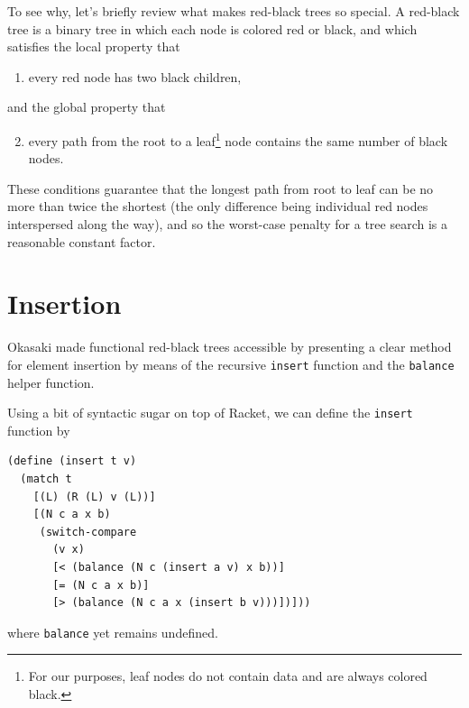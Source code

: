 \documentclass[preprint]{sigplanconf}
\begin{document}
To see why, let's briefly review what makes red-black trees so special. A red-black tree is a binary tree in which each node is colored red or black, and which satisfies the local property that
\begin{enumerate}
\item every red node has two black children,
\end{enumerate}
and the global property that
\begin{enumerate}
\setcounter{enumi}{1}
\item every path from the root to a leaf\footnote{For our purposes, leaf nodes do not contain data and are always colored black.} node contains the same number of black nodes.
\end{enumerate}
These conditions guarantee that the longest path from root to leaf can be no more than twice the shortest (the only difference being individual red nodes interspersed along the way), and so the worst-case penalty for a tree search is a reasonable constant factor.

\section{Insertion}

Okasaki \cite{okasaki1999functional} made functional red-black trees accessible by presenting a clear method for element insertion by means of the recursive \texttt{insert} function and the \texttt{balance} helper function.

Using a bit of syntactic sugar on top of Racket, we can define the \texttt{insert} function by
\begin{verbatim}
(define (insert t v)
  (match t
    [(L) (R (L) v (L))]
    [(N c a x b)
     (switch-compare
       (v x)
       [< (balance (N c (insert a v) x b))]
       [= (N c a x b)]
       [> (balance (N c a x (insert b v)))])]))
\end{verbatim}
where \texttt{balance} yet remains undefined.
\end{document}

